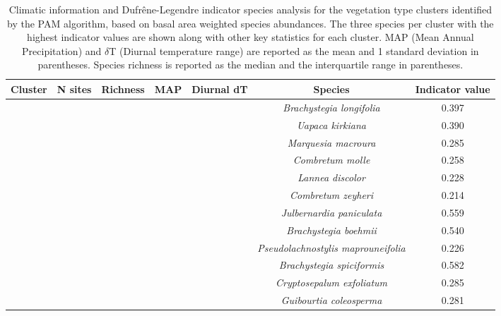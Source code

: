 \begin{table}[p]
\caption[Description of vegetation types]{Climatic information and Dufr\^{e}ne-Legendre indicator species analysis for the vegetation type clusters identified by the PAM algorithm, based on basal area weighted species abundances. The three species per cluster with the highest indicator values are shown along with other key statistics for each cluster. MAP (Mean Annual Precipitation) and $\delta$T (Diurnal temperature range) are reported as the mean and 1 standard deviation in parentheses. Species richness is reported as the median and the interquartile range in parentheses.} 
\label{phen:clust_summ}
\begin{tabular}{S[table-format=1.0]S[table-format=3.0]ccccS[table-format=1.3]}
  \toprule
{Cluster} & {N sites} & {Richness} & {MAP} & {Diurnal dT} & {Species} & {Indicator value} \\
  \midrule
{} & {} & {} & {} & {} & \textit{Brachystegia longifolia} & 0.397 \\ 
   &  &  &  &  & \textit{Uapaca kirkiana} & 0.390 \\ 
   &  &  &  &  & \textit{Marquesia macroura} & 0.285 \\ 
  \midrule
{} & {} & {} & {} & {} & \textit{Combretum molle} & 0.258 \\ 
   &  &  &  &  & \textit{Lannea discolor} & 0.228 \\ 
   &  &  &  &  & \textit{Combretum zeyheri} & 0.214 \\ 
  \midrule
{} & {} & {} & {} & {} & \textit{Julbernardia paniculata} & 0.559 \\ 
   &  &  &  &  & \textit{Brachystegia boehmii} & 0.540 \\ 
   &  &  &  &  & \textit{Pseudolachnostylis maprouneifolia} & 0.226 \\ 
  \midrule
{} & {} & {} & {} & {} & \textit{Brachystegia spiciformis} & 0.582 \\ 
   &  &  &  &  & \textit{Cryptosepalum exfoliatum} & 0.285 \\ 
   &  &  &  &  & \textit{Guibourtia coleosperma} & 0.281 \\ 
   \bottomrule
\end{tabular}
\end{table}

